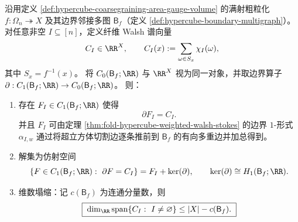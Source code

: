 

\begin{theorem}\label{thm:fold-hypercube-fiber-walsh-divergence-torsor}
沿用定义 \ref{def:hypercube-coarsegraining-area-gauge-volume} 的满射粗粒化 \(f:\Omega_n\twoheadrightarrow X\) 及其边界邻接多图 \(\mathsf B_f\)（定义 \ref{def:hypercube-boundary-multigraph}）。
对任意非空 \(I\subseteq[n]\)，定义纤维 Walsh 谱向量
\[
C_I\in \RR^{X},
\qquad
C_I(x):=\sum_{\omega\in S_x}\chi_I(\omega),
\]
其中 \(S_x=f^{-1}(x)\)。
将 \(C_0(\mathsf B_f;\RR)\) 与 \(\RR^{X}\) 视为同一对象，并取边界算子 \(\partial:C_1(\mathsf B_f;\RR)\to C_0(\mathsf B_f;\RR)\)。
则：
\begin{enumerate}
  \item \label{it:fiber-walsh-div-existence} 存在 \(F_I\in C_1(\mathsf B_f;\RR)\) 使得
  \[
  \boxed{\;\partial F_I=C_I.\;}
  \]
  并且 \(F_I\) 可由定理 \ref{thm:fold-hypercube-weighted-walsh-stokes} 的边界 \(1\)-形式 \(\alpha_{I,w}\) 通过将超立方体切割边逐条推前到 \(\mathsf B_f\) 的有向多重边并加总得到。
  \item \label{it:fiber-walsh-torsor} 解集为仿射空间
  \[
  \{F\in C_1(\mathsf B_f;\RR):\ \partial F=C_I\}
  =F_I+\ker(\partial),
  \qquad
  \ker(\partial)\cong H_1(\mathsf B_f;\RR).
  \]
  \item \label{it:fiber-walsh-dim-collapse} 维数塌缩：记 \(c(\mathsf B_f)\) 为连通分量数，则
  \[
  \boxed{\;\dim_{\RR}\operatorname{span}\{C_I:\ I\neq\varnothing\}\le |X|-c(\mathsf B_f).\;}
  \]
\end{enumerate}
\end{theorem}
